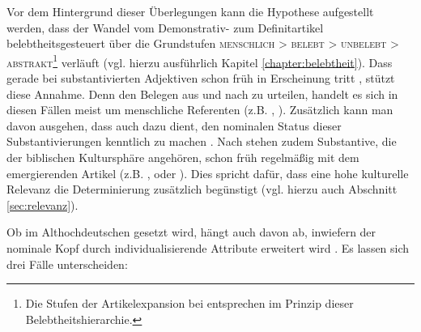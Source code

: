 Vor dem Hintergrund dieser Überlegungen kann die Hypothese aufgestellt werden, dass der Wandel vom Demonstrativ- zum Definitartikel belebtheitsgesteuert über die Grundstufen \textsc{menschlich > belebt > unbelebt > abstrakt}\footnote{Die Stufen der Artikelexpansion bei \textcite[34ff.]{Hodler1954} entsprechen im Prinzip dieser Belebtheitshierarchie.} verläuft (vgl. hierzu ausführlich Kapitel \ref{chapter:belebtheit}). Dass  gerade bei substantivierten Adjektiven schon früh in Erscheinung tritt \parencite[44]{Ebert1978}, stützt diese Annahme. Denn den Belegen aus \textcite[55f.]{Jager1917} und \textcite[75f.]{Oubouzar1992} nach zu urteilen, handelt es sich in diesen Fällen meist um menschliche Referenten (z.B.  ,  ). Zusätzlich kann man davon ausgehen, dass  auch dazu dient, den nominalen Status dieser Substantivierungen kenntlich zu machen \parencite[vgl. auch][174]{Leiss2000}. 
Nach \textcite[45]{Hodler1954} stehen zudem Substantive, die der biblischen Kultursphäre angehören, schon früh regelmäßig mit dem emergierenden Artikel (z.B.  ,   oder  ). Dies spricht dafür, dass eine hohe kulturelle Relevanz die Determinierung zusätzlich begünstigt (vgl. hierzu auch Abschnitt \ref{sec:relevanz}).   


Ob  im Althochdeutschen gesetzt wird, hängt auch davon ab, inwiefern der nominale Kopf durch individualisierende Attribute erweitert wird \parencite[vgl.][]{Graf1905,Witzig1910,Jager1917,Hodler1954,Oubouzar1992,Oubouzar1997,Schrodt2004,Szczepaniak2015}. Es lassen sich drei Fälle unterscheiden: 

